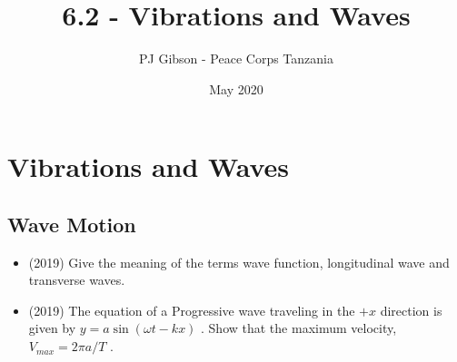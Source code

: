 \documentclass{article}
\title{6.2 - Vibrations and Waves}
\author{PJ Gibson - Peace Corps Tanzania}
\date{May 2020}
\begin{document}
\maketitle


\section{Vibrations and Waves}

\subsection{Wave Motion}
\begin{itemize}
\item (2019)  Give the meaning of the terms wave function, longitudinal wave and transverse waves.
\item (2019)  The equation of a Progressive wave traveling in the $ +x$ direction is given by $ y= a \sin(\omega t-kx)$ .  Show that the maximum velocity, $ V_{max}=2\pi a /T$ . 
\end{itemize}
\end{document}
